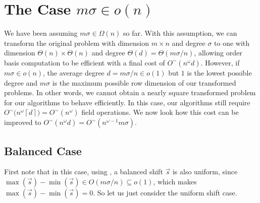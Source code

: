 
\section{The Case $m\sigma\in o(n)$}

\label{sec:removeCeilingFunction}

We have been assuming $m\sigma\in\Omega(n)$ so far. With this assumption,
we can transform the original problem with dimension $m\times n$
and degree $\sigma$ to one with dimension $\Theta(n)\times\Theta(n)$
and degree $\Theta(d)=\Theta(m\sigma/n)$, allowing order basis computation
to be efficient with a final cost of $O^{\sim}(n^{\omega}d)$. However,
if $m\sigma\in o(n)$, the average degree $d=m\sigma/n\in o(1)$ but
$1$ is the lowest possible degree and $m\sigma$ is the maximum possible
row dimension of our transformed problems. In other words, we cannot
obtain a nearly square transformed problem for our algorithms to behave
efficiently. In this case, our algorithms still require $O^{\sim}(n^{\omega}$$\left\lceil d\right\rceil )=O^{\sim}(n^{\omega})$
field operations. We now look how this cost can be improved to $O^{\sim}(n^{\omega}d)=O^{\sim}(n^{\omega-1}m\sigma)$.


\subsection{Balanced Case}

First note that in this case, using ,
a balanced shift $\vec{s}$ is also uniform, since $\max\left(\vec{s}\right)-\min\left(\vec{s}\right)\in O\left(m\sigma/n\right)\subseteq o(1)$,
which makes $\max\left(\vec{s}\right)-\min\left(\vec{s}\right)=0$.
So let us just consider the uniform shift case.

